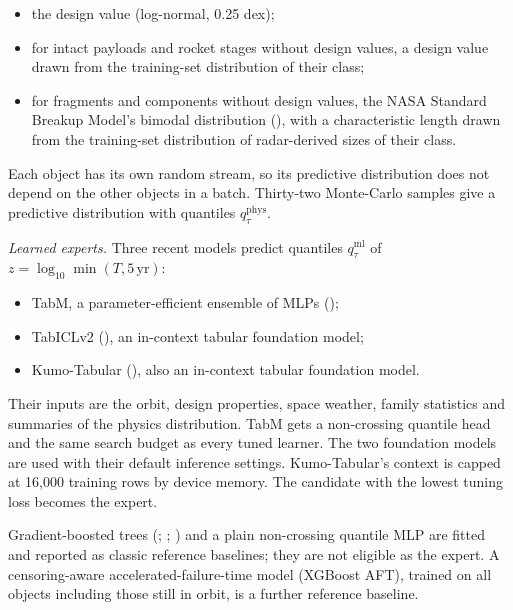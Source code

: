 \documentclass[
]{article}
\providecommand{\tightlist}{%
  \setlength{\itemsep}{0pt}\setlength{\parskip}{0pt}}
\begin{document}
\begin{itemize}
\tightlist
\item
  the design value (log-normal, 0.25 dex);
\item
  for intact payloads and rocket stages without design values, a design
  value drawn from the training-set distribution of their class;
\item
  for fragments and components without design values, the NASA Standard
  Breakup Model's bimodal distribution
  (), with a
  characteristic length drawn from the training-set distribution of
  radar-derived sizes of their class.
\end{itemize}

Each object has its own random stream, so its predictive distribution
does not depend on the other objects in a batch. Thirty-two Monte-Carlo
samples give a predictive distribution with quantiles
\(q^{\text{phys}}_\tau\).

\emph{Learned experts.} Three recent models predict quantiles
\(q^{\text{ml}}_\tau\) of \(z = \log_{10}\min(T, 5\,\text{yr})\):

\begin{itemize}
\tightlist
\item
  TabM, a parameter-efficient ensemble of MLPs
  ();
\item
  TabICLv2 (), an
  in-context tabular foundation model;
\item
  Kumo-Tabular (), also an
  in-context tabular foundation model.
\end{itemize}

Their inputs are the orbit, design properties, space weather, family
statistics and summaries of the physics distribution. TabM gets a
non-crossing quantile head and the same search budget as every tuned
learner. The two foundation models are used with their default inference
settings. Kumo-Tabular's context is capped at 16,000 training rows by
device memory. The candidate with the lowest tuning loss becomes the
expert.

Gradient-boosted trees (; ;
)
and a plain non-crossing quantile MLP are fitted and reported as classic
reference baselines; they are not eligible as the expert. A
censoring-aware accelerated-failure-time model (XGBoost AFT), trained on
all objects including those still in orbit, is a further reference
baseline.
\end{document}
